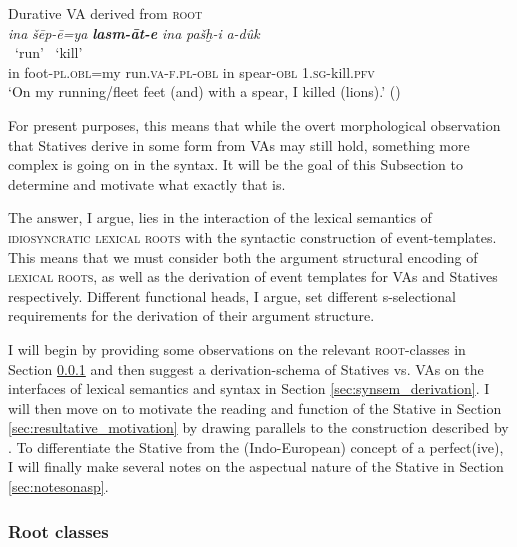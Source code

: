 \documentclass[output=paper,colorlinks,citecolor=brown]{langscibook}
\begin{document}
\begin{exe} 
\ex Durative VA derived from  \textsc{root} \label{ex:lasmu}\\
\glll \textit{ina} \textit{šēp-ē=ya} {\textit{\textbf{lasm-āt-e}} } \textit{ina} \textit{pašḫ-i} {\textit{a-dûk} }\\
{} {} ~`run' {} {} ~`kill'\\
 in foot-\textsc{pl.obl}=my run.\textsc{va}-\textsc{f.pl-obl} in spear-\textsc{obl} 1.\textsc{sg}-kill.\textsc{pfv}\\
\glt `On my running/fleet feet (and) with a spear, I killed (lions).' ()    
\end{exe}

 For present purposes, this means that while the overt morphological observation that Statives derive in some form from VAs may still hold, something more complex is going on in the syntax. It will be the goal of this Subsection to determine and motivate what exactly that is.

The answer, I argue, lies in the interaction of the lexical semantics of \textsc{idiosyncratic lexical roots} with the syntactic construction of event-templates. This means that we must consider both the argument structural encoding of \textsc{lexical roots}, as well as the derivation of event templates for VAs and Statives respectively. Different functional heads, I argue, set different s-selectional requirements for the derivation of their argument structure.

I will begin by providing some observations on the relevant \textsc{root}-classes in Section \ref{sec:rootclasses} and then suggest a derivation-schema of Statives vs. VAs on the interfaces of lexical semantics and syntax in Section \ref{sec:synsem_derivation}. I will then move on to motivate the  reading and function of the Stative in Section \ref{sec:resultative_motivation} by drawing parallels to the  construction described by \citet{LevinRappaport1995}. To differentiate the Stative from the (Indo-European) concept of a perfect(ive), I will finally make several notes on the aspectual nature of the Stative in Section \ref{sec:notesonasp}.


\subsubsection{Root classes}\label{sec:rootclasses}
\end{document}
